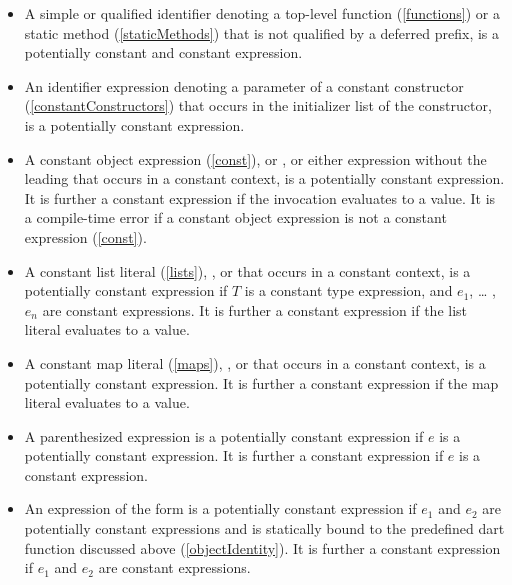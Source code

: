 \documentclass[makeidx]{article}
\begin{document}
\begin{itemize}
\item A simple or qualified identifier denoting a top-level function (\ref{functions}) or a static method (\ref{staticMethods}) that is not qualified by a deferred prefix, is a potentially constant and constant expression.

\item An identifier expression denoting a parameter of a constant constructor (\ref{constantConstructors}) that occurs in the initializer list of the constructor, is a potentially constant expression.

\item A constant object expression (\ref{const}),
 or
,
or either expression without the leading \CONST{} that occurs in a constant context, is a potentially constant expression.
It is further a constant expression if the invocation evaluates to a value.
It is a compile-time error if a constant object expression is
not a constant expression (\ref{const}).

\item A constant list literal (\ref{lists}),
, or
that occurs in a constant context, is a potentially constant expression if $T$ is a constant type expression, and $e_1$, \ldots{} , $e_n$ are constant expressions.
It is further a constant expression if the list literal evaluates to a value.

\item A constant map literal (\ref{maps}),
, or
 that occurs in a constant context,
is a potentially constant expression.
It is further a constant expression if the map literal evaluates to a value.

\item A parenthesized expression  is a potentially constant expression if $e$ is a potentially constant expression. It is further a constant expression if $e$ is a constant expression.

\item An expression of the form  is a potentially constant expression if $e_1$ and $e_2$ are potentially constant expressions and  is statically bound to the predefined dart function  discussed above (\ref{objectIdentity}). It is further a constant expression if $e_1$ and $e_2$ are constant expressions.


\end{itemize}
\end{document}
